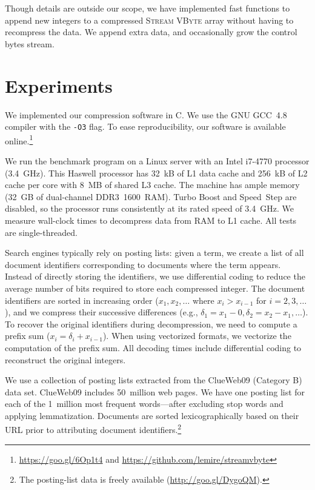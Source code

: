 \documentclass[compress]{elsarticle}
\newcommand{\vbyte}{VByte}
\newcommand{\streamvbyte}{\textsc{Stream \vbyte{}}}
\begin{document}
Though details are outside our scope, we have implemented fast functions
to append new integers to a compressed \streamvbyte{} array without having to recompress the data.
We  append extra data, and occasionally grow the control bytes stream.








\section{Experiments}

We implemented our compression software in C. We use
the GNU GCC~4.8 compiler with  the \texttt{-O3} flag. To ease reproducibility, our software is  available online.\footnote{\url{https://goo.gl/6Op1t4} and \url{https://github.com/lemire/streamvbyte}}



We run the benchmark program on  a Linux server with an Intel i7-4770 processor (\SI{3.4}{GHz}).
This Haswell processor has \SI{32}{kB} of L1 data cache and \SI{256}{kB} of L2 cache per core with \SI{8}{MB} of shared L3 cache.
The machine has ample memory (\SI{32}{GB} of dual-channel DDR3~1600~RAM).
Turbo Boost and Speed~Step are disabled, so the processor runs consistently at its rated speed of \SI{3.4}{GHz}.
We measure wall-clock  times to decompress data from RAM to L1 cache.  All tests are single-threaded.


Search engines typically rely on posting lists: given a term,
we create a list of all document identifiers corresponding to documents where the term appears. 
Instead of directly storing the identifiers, we
use differential coding to reduce the average number of bits required to store each compressed integer. The document identifiers are sorted in
increasing order ($x_1, x_2, \ldots$ where $x_i>x_{i-1}$ for $i=2,3,\ldots$),
and we compress their successive differences (e.g., $\delta_1=x_1-0, \delta_2=x_2-x_1, \ldots$). To recover the original identifiers during decompression, we need to compute a prefix sum
 ($x_i = \delta_i+x_{i-1}$). When using vectorized formats, we
 vectorize the computation of the prefix sum.
 All decoding times include differential coding to reconstruct the original integers.


We use a collection of posting lists extracted from the ClueWeb09 (Category B) data set. ClueWeb09 includes 50~million web pages. We have one posting list for each of the 1~million most frequent words---after excluding stop words and applying lemmatization. Documents are sorted lexicographically based on their URL prior to attributing document identifiers.\footnote{The posting-list data is freely available (\url{http://goo.gl/DygoQM}).}
\end{document}
